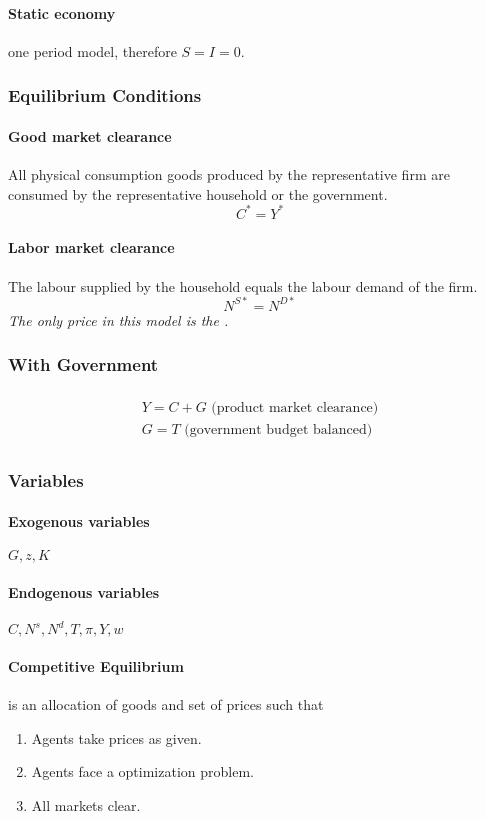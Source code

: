 \documentclass[11pt]{article}
\begin{document}
\paragraph{Static economy} one period model, therefore $S = I = 0$.
\subsubsection{Equilibrium Conditions}
\paragraph{Good market clearance} All physical consumption goods produced by the representative firm are consumed by the representative household or the government.
\[
C^* = Y^*
\]
\paragraph{Labor market clearance} The labour supplied by the household equals the labour demand of the firm.
\[
N^{S*} = N^{D*}
\]
\emph{The only price in this model is the .}

\subsubsection{With Government}
\begin{multline*}
	\\
	Y = C + G \text{ (product market clearance)} \\
	G = T \text{ (government budget balanced)} \\
\end{multline*}

\subsubsection{Variables}
\paragraph{Exogenous variables} $G, z, K$
\paragraph{Endogenous variables} $C, N^s, N^d, T, \pi, Y, w$

\paragraph{Competitive Equilibrium} is an allocation of goods and set of prices such that
\begin{enumerate}
	\item Agents take prices as given.
	\item Agents face a optimization problem.
	\item All markets clear.
\end{enumerate}
\end{document}
